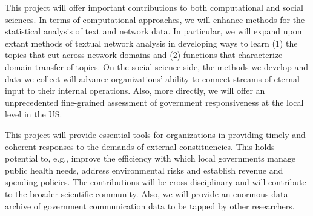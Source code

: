 
 This project will offer important contributions to both computational and social sciences. In terms of computational approaches, we will enhance methods for the statistical analysis of text and network data. In particular, we will expand upon extant methods of textual network analysis in developing ways to learn (1) the topics that cut across network domains and (2) functions that characterize domain transfer of topics.  On the social science side, the methods we develop and data we collect will advance organizations' ability to connect streams of eternal input to their internal operations. Also, more directly, we will offer an unprecedented fine-grained assessment of government responsiveness at the local level in the US.  \vspace{.25cm}


 This project will provide essential tools for organizations in providing timely and coherent responses to the demands of external constituencies. This holds potential to, e.g., improve the efficiency with which local governments manage public health needs, address environmental risks and establish revenue and spending policies. The contributions will be cross-disciplinary and will contribute to the broader scientific community. Also, we will provide an enormous data archive of government communication data to be tapped by other researchers.




